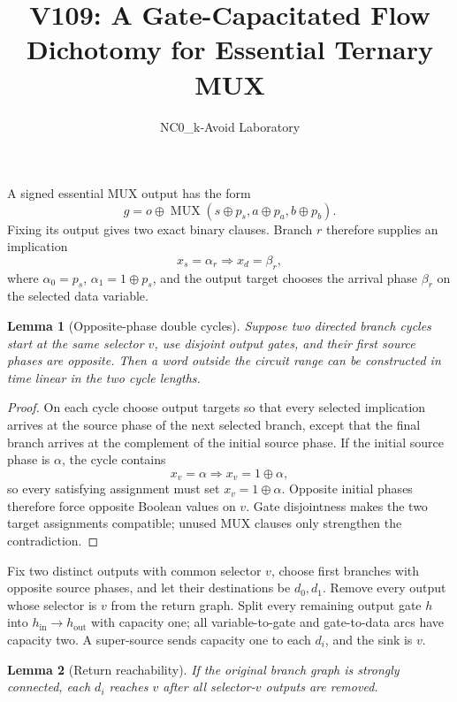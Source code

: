 \documentclass[11pt]{article}
\newtheorem{lemma}{Lemma}
\begin{document}
\title{V109: A Gate-Capacitated Flow Dichotomy for Essential Ternary MUX}
\author{NC0\_k-Avoid Laboratory}
\date{}
\maketitle

A signed essential MUX output has the form
\[
 g=o\oplus \operatorname{MUX}(s\oplus p_s,a\oplus p_a,b\oplus p_b).
\]
Fixing its output gives two exact binary clauses.  Branch $r$ therefore supplies
an implication
\[
 x_s=\alpha_r\Longrightarrow x_d=\beta_r,
\]
where $\alpha_0=p_s$, $\alpha_1=1\oplus p_s$, and the output target chooses the
arrival phase $\beta_r$ on the selected data variable.

\begin{lemma}[Opposite-phase double cycles]
Suppose two directed branch cycles start at the same selector $v$, use disjoint
output gates, and their first source phases are opposite.  Then a word outside
the circuit range can be constructed in time linear in the two cycle lengths.
\end{lemma}

\begin{proof}
On each cycle choose output targets so that every selected implication arrives
at the source phase of the next selected branch, except that the final branch
arrives at the complement of the initial source phase.  If the initial source
phase is $\alpha$, the cycle contains
\[
 x_v=\alpha\Longrightarrow x_v=1\oplus\alpha,
\]
so every satisfying assignment must set $x_v=1\oplus\alpha$.  Opposite initial
phases therefore force opposite Boolean values on $v$.  Gate disjointness makes
the two target assignments compatible; unused MUX clauses only strengthen the
contradiction.
\end{proof}

Fix two distinct outputs with common selector $v$, choose first branches with
opposite source phases, and let their destinations be $d_0,d_1$.  Remove every
output whose selector is $v$ from the return graph.  Split every remaining
output gate $h$ into $h_{\mathrm{in}}\to h_{\mathrm{out}}$ with capacity one;
all variable-to-gate and gate-to-data arcs have capacity two.  A super-source
sends capacity one to each $d_i$, and the sink is $v$.

\begin{lemma}[Return reachability]
If the original branch graph is strongly connected, each $d_i$ reaches $v$
after all selector-$v$ outputs are removed.
\end{lemma}
\end{document}
